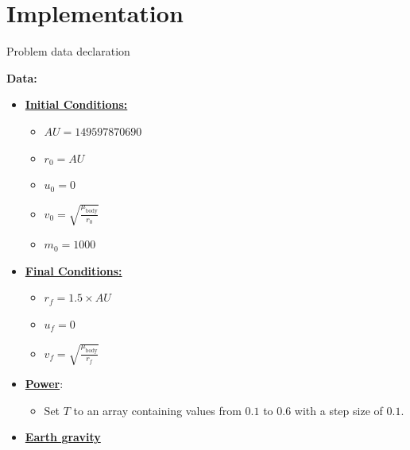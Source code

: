 \documentclass{article}
\begin{document}
	\section{Implementation}
	
	\begin{algorithm}[H]
		\caption{Problem data declaration}\label{alg:satellite_maneuvering}
		\begin{algorithmic}
			\State \textbf{Data:} \\
			\begin{itemize}[]
				\item \textbf{\underline{Initial Conditions:}}
				\begin{itemize}
					\item $AU = 149597870690$
					\item $r_0 = AU$
					\item $u_0 = 0$
					\item $v_0 = \sqrt{\frac{\mu_{\text{body}}}{r_0}}$
					\item$ m_0=1000$
				\end{itemize}
				\item \textbf{\underline{Final Conditions:}}
				\begin{itemize}
					\item $r_f = 1.5 \times AU$
					\item $u_f = 0$
					\item $v_f = \sqrt{\frac{\mu_{\text{body}}}{r_f}}$
				\end{itemize}
				\item \textbf{\underline{Power}}:
				\begin{itemize}
					\item Set $T$ to an array containing values from $0.1$ to $0.6$ with a step size of $0.1$.
				\end{itemize}
				\item \textbf{\underline{Earth gravity}}

\end{itemize}
\end{algorithmic}
\end{algorithm}
\end{document}
